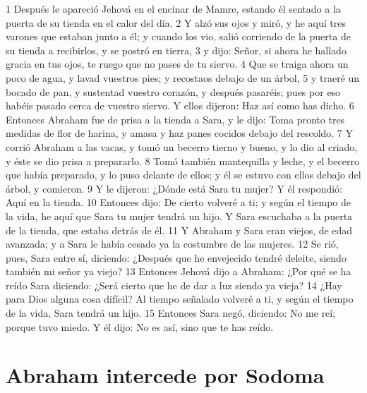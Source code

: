 1 Después le apareció Jehová en el encinar de Mamre, estando él sentado a la puerta de su tienda en el calor del día.
2 Y alzó sus ojos y miró, y he aquí tres varones que estaban junto a él; y cuando los vio, salió corriendo de la puerta de su tienda a recibirlos, y se postró en tierra,
3 y dijo: Señor, si ahora he hallado gracia en tus ojos, te ruego que no pases de tu siervo.
4 Que se traiga ahora un poco de agua, y lavad vuestros pies; y recostaos debajo de un árbol,
5 y traeré un bocado de pan, y sustentad vuestro corazón, y después pasaréis; pues por eso habéis pasado cerca de vuestro siervo. Y ellos dijeron: Haz así como has dicho.
6 Entonces Abraham fue de prisa a la tienda a Sara, y le dijo: Toma pronto tres medidas de flor de harina, y amasa y haz panes cocidos debajo del rescoldo.
7 Y corrió Abraham a las vacas, y tomó un becerro tierno y bueno, y lo dio al criado, y éste se dio prisa a prepararlo.
8 Tomó también mantequilla y leche, y el becerro que había preparado, y lo puso delante de ellos; y él se estuvo con ellos debajo del árbol, y comieron.
9 Y le dijeron: ¿Dónde está Sara tu mujer? Y él respondió: Aquí en la tienda.
10 Entonces dijo: De cierto volveré a ti; y según el tiempo de la vida, he aquí que Sara tu mujer tendrá un hijo. Y Sara escuchaba a la puerta de la tienda, que estaba detrás de él.
11 Y Abraham y Sara eran viejos, de edad avanzada; y a Sara le había cesado ya la costumbre de las mujeres.
12 Se rió, pues, Sara entre sí, diciendo: ¿Después que he envejecido tendré deleite, siendo también mi señor ya viejo?
13 Entonces Jehová dijo a Abraham: ¿Por qué se ha reído Sara diciendo: ¿Será cierto que he de dar a luz siendo ya vieja?
14 ¿Hay para Dios alguna cosa difícil? Al tiempo señalado volveré a ti, y según el tiempo de la vida, Sara tendrá un hijo.
15 Entonces Sara negó, diciendo: No me reí; porque tuvo miedo. Y él dijo: No es así, sino que te has reído.

\section*{Abraham intercede por Sodoma}

